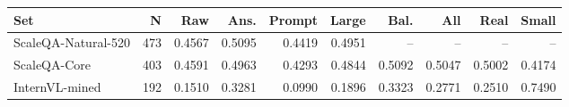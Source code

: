 \begin{tabular}{lrrrrrrrrr}
\toprule
Set & N & Raw & Ans. & Prompt & Large & Bal. & All & Real & Small \\
\midrule
ScaleQA-Natural-520 & 473 & 0.4567 & 0.5095 & 0.4419 & 0.4951 & -- & -- & -- & -- \\
ScaleQA-Core & 403 & 0.4591 & 0.4963 & 0.4293 & 0.4844 & 0.5092 & 0.5047 & 0.5002 & 0.4174 \\
InternVL-mined & 192 & 0.1510 & 0.3281 & 0.0990 & 0.1896 & 0.3323 & 0.2771 & 0.2510 & 0.7490 \\
\bottomrule
\end{tabular}
